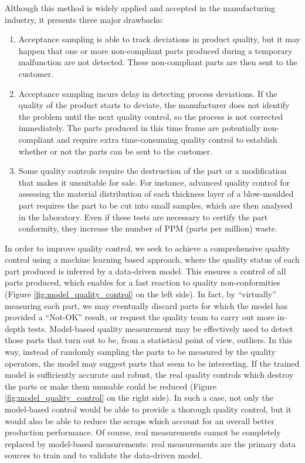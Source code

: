 Although this method is widely applied and accepted in the manufacturing industry, it presents three major drawbacks:
\begin{enumerate}
    \item Acceptance sampling is able to track deviations in product quality, but it  may happen that one or more non-compliant parts produced during a temporary malfunction are not detected. These non-compliant parts are then sent to the customer.
    \item Acceptance sampling incurs delay in detecting process deviations. If the quality of the product starts to deviate, the manufacturer does not identify the problem until the next quality control, so the process is not corrected immediately. The parts produced in this time frame are potentially non-compliant and require extra time-consuming quality control to establish whether or not the parts can be sent to the customer.
    \item Some quality controls require the destruction of the part or a modification that makes it unsuitable for sale. For instance, advanced quality control for assessing the material distribution of each thickness layer of a blow-moulded part requires the part to be cut into small samples, which are then analysed in the laboratory. Even if these tests are necessary to certify the part conformity, they increase the number of PPM (parts per million) waste.
\end{enumerate}

In order to improve quality control, we seek to achieve a comprehensive quality control using a machine learning based approach, where the quality status of each part produced is inferred by a data-driven model. 
This ensures a control of all parts produced, which enables for a fast reaction to quality non-conformities (Figure \ref{fig:model_quality_control} on the left side). In fact, by ``virtually'' measuring each part, we may eventually discard parts for which the model has provided a ``Not-OK'' result, or request the quality team to carry out more in-depth tests. Model-based quality measurement may be effectively used to detect those parts that turn out to be, from a statistical point of view, outliers. In this way, instead of randomly sampling the parts to be measured by the quality operators, the model may suggest parts that seem to be interesting.
If the trained model is sufficiently accurate and robust, the real quality controls which destroy the parts or make them unusable could be reduced (Figure \ref{fig:model_quality_control} on the right side). In such a case, not only the model-based control would be able to provide a thorough quality control, but it would also be able to reduce the scraps which account for an overall better production performance. Of course, real measurements cannot be completely replaced by model-based measurements: real measurements are the primary data sources to train and to validate the data-driven model. 

